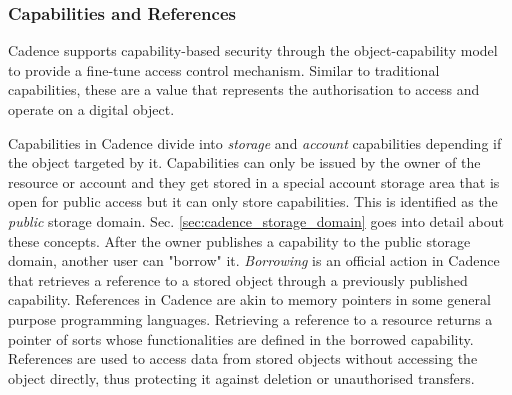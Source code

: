 \documentclass[../NFTComp_IEEE.tex]{subfiles}
\begin{document}
\subsubsection{Capabilities and References}
\label{sec:cadence_capabilities}
Cadence supports capability-based security through the object-capability model to provide a fine-tune access control mechanism. Similar to traditional capabilities, these are a value that represents the authorisation to access and operate on a digital object.
\par
Capabilities in Cadence divide into \textit{storage} and \textit{account} capabilities depending if the object targeted by it. Capabilities can only be issued by the owner of the resource or account and they get stored in a special account storage area that is open for public access but it can only store capabilities. This is identified as the \textit{public} storage domain. Sec. \ref{sec:cadence_storage_domain} goes into detail about these concepts. After the owner publishes a capability to the public storage domain, another user can "borrow" it. \textit{Borrowing} is an official action in Cadence that retrieves a reference to a stored object through a previously published capability. References in Cadence are akin to memory pointers in some general purpose programming languages. Retrieving a reference to a resource returns a pointer of sorts whose functionalities are defined in the borrowed capability. References are used to access data from stored objects without accessing the object directly, thus protecting it against deletion or unauthorised transfers.
\end{document}
